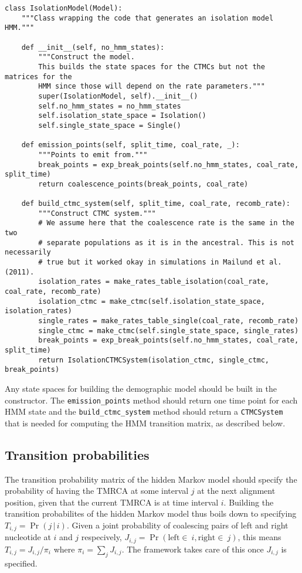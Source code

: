 \documentclass[11pt]{article}
\begin{document}
\begin{verbatim}
class IsolationModel(Model):
    """Class wrapping the code that generates an isolation model HMM."""

    def __init__(self, no_hmm_states):
        """Construct the model.
        This builds the state spaces for the CTMCs but not the matrices for the
        HMM since those will depend on the rate parameters."""
        super(IsolationModel, self).__init__()
        self.no_hmm_states = no_hmm_states
        self.isolation_state_space = Isolation()
        self.single_state_space = Single()

    def emission_points(self, split_time, coal_rate, _):
        """Points to emit from."""
        break_points = exp_break_points(self.no_hmm_states, coal_rate, split_time)
        return coalescence_points(break_points, coal_rate)

    def build_ctmc_system(self, split_time, coal_rate, recomb_rate):
        """Construct CTMC system."""
        # We assume here that the coalescence rate is the same in the two
        # separate populations as it is in the ancestral. This is not necessarily
        # true but it worked okay in simulations in Mailund et al. (2011).
        isolation_rates = make_rates_table_isolation(coal_rate, coal_rate, recomb_rate)
        isolation_ctmc = make_ctmc(self.isolation_state_space, isolation_rates)
        single_rates = make_rates_table_single(coal_rate, recomb_rate)
        single_ctmc = make_ctmc(self.single_state_space, single_rates)
        break_points = exp_break_points(self.no_hmm_states, coal_rate, split_time)
        return IsolationCTMCSystem(isolation_ctmc, single_ctmc, break_points)
\end{verbatim}

Any state spaces for building the demographic model should be built in the constructor. The \texttt{emission\_points} method should return one time point for each HMM state and the \texttt{build\_ctmc\_system} method should return a \texttt{CTMCSystem} that is needed for computing the HMM transition matrix, as described below.

\subsection{Transition probabilities}

The transition probability matrix of the hidden Markov model should specify the probability of having the TMRCA at some interval $j$ at the next alignment position, given that the current TMRCA is at time interval $i$. Building the transition probabilites of the hidden Markov model thus boils down to specifying $T_{i,j} = \Pr(j\,|\,i)$. Given a joint probability of coalescing pairs of left and right nucleotide at $i$ and $j$ respecively, $J_{i,j} = \Pr(\mathrm{left}\in~i, \mathrm{right}\in~j)$, this means $T_{i,j}=J_{i,j}/\pi_i$ where $\pi_i=\sum_j J_{i,j}$. The framework takes care of this once $J_{i,j}$ is specified.
\end{document}
